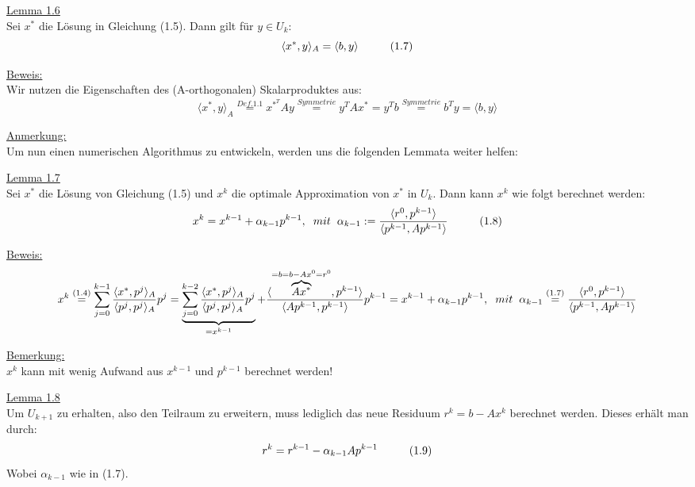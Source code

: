 \documentclass[a4paper]{letter}
\begin{document}
\underline{Lemma 1.6}
\\Sei $x^{*}$ die L\"osung in Gleichung (1.5). Dann gilt f\"ur $y \in U_{k}$:
$$\langle x^{*}, y \rangle _{A} = \langle b, y \rangle \hspace{10mm} (1.7)$$

\underline{Beweis:}
\\Wir nutzen die Eigenschaften des (A-orthogonalen) Skalarproduktes aus:
$$\langle x^{*}, y \rangle _{A} \overset{Def. 1.1}{=} x^{{*}^{T}}Ay \overset{Symmetrie}{=} y^{T}Ax^{*} = y^{T}b \overset{Symmetrie}{=} b^{T}y = \langle b, y \rangle$$

\underline{Anmerkung:}
\\Um nun einen numerischen Algorithmus zu entwickeln, werden uns die folgenden Lemmata weiter helfen:

\underline{Lemma 1.7}
\\Sei $x^{*}$ die L\"osung von Gleichung (1.5) und $x^{k}$ die optimale Approximation von $x^{*}$ in $U_{k}$. Dann kann $x^{k}$ wie folgt berechnet werden:
$$x^{k} = x^{k-1} + \alpha_{k-1}p^{k-1}, \hspace{2mm} mit \hspace{2mm} \alpha_{k-1} := \frac {\langle r^{0}, p^{k-1} \rangle} {\langle {p^{k-1}, Ap^{k-1}} \rangle} \hspace{10mm} (1.8)$$

\underline{Beweis:}
$$x^{k} \overset{(1.4)}{=}
\sum_{j=0}^{k-1} \frac {\langle x^{*}, p^{j} \rangle _{A}} {\langle {p^{j}, p^{j}} \rangle _{A}} p^{j} =
\underbrace{\sum_{j=0}^{k-2} \frac {\langle x^{*}, p^{j} \rangle _{A}} {\langle {p^{j}, p^{j}} \rangle _{A}} p^{j}}_{=x^{k-1}} +
\frac {\langle \overbrace{Ax^{*}}^{=b=b-Ax^{0}=r^{0}}, p^{k-1} \rangle} {\langle {Ap^{k-1}, p^{k-1}} \rangle} p^{k-1} =
x^{k-1} + \alpha_{k-1}p^{k-1}, \hspace{2mm} mit \hspace{2mm} \alpha_{k-1} \overset{(1.7)}{=}
\frac {\langle r^{0}, p^{k-1} \rangle} {\langle {p^{k-1}, Ap^{k-1}} \rangle}$$

\underline{Bemerkung:}
\\$x^{k}$ kann mit wenig Aufwand aus $x^{k-1}$ und $p^{k-1}$ berechnet werden!

\underline{Lemma 1.8}
\\Um $U_{k+1}$ zu erhalten, also den Teilraum zu erweitern, muss lediglich das neue Residuum $r^{k} = b - Ax^{k}$ berechnet werden. Dieses erh\"alt man durch:
$$r^{k} = r^{k-1} - \alpha_{k-1}Ap^{k-1} \hspace{10mm} (1.9)$$
Wobei $\alpha_{k-1}$ wie in (1.7).
\end{document}
